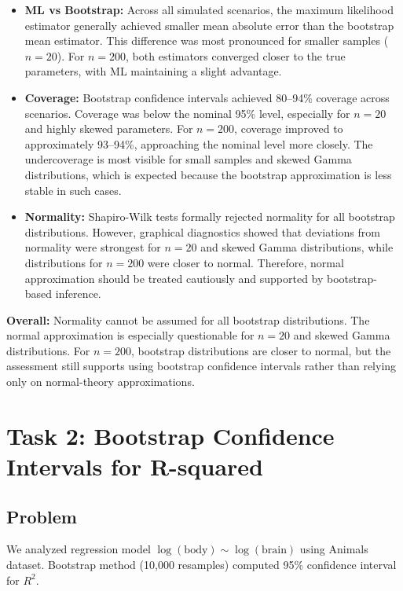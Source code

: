 \documentclass[12pt, a4paper]{article}\usepackage[]{graphicx}\usepackage[]{xcolor}
\begin{document}
\begin{itemize}
\item \textbf{ML vs Bootstrap:} Across all simulated scenarios, the maximum likelihood estimator generally achieved smaller mean absolute error than the bootstrap mean estimator. This difference was most pronounced for smaller samples ($n=20$). For $n=200$, both estimators converged closer to the true parameters, with ML maintaining a slight advantage.

\item \textbf{Coverage:} Bootstrap confidence intervals achieved 80--94\% coverage across scenarios. Coverage was below the nominal 95\% level, especially for $n=20$ and highly skewed parameters. For $n=200$, coverage improved to approximately 93--94\%, approaching the nominal level more closely. The undercoverage is most visible for small samples and skewed Gamma distributions, which is expected because the bootstrap approximation is less stable in such cases.

\item \textbf{Normality:} Shapiro-Wilk tests formally rejected normality for all bootstrap distributions. However, graphical diagnostics showed that deviations from normality were strongest for $n=20$ and skewed Gamma distributions, while distributions for $n=200$ were closer to normal. Therefore, normal approximation should be treated cautiously and supported by bootstrap-based inference.
\end{itemize}

\textbf{Overall:} Normality cannot be assumed for all bootstrap distributions. The normal approximation is especially questionable for $n = 20$ and skewed Gamma distributions. For $n = 200$, bootstrap distributions are closer to normal, but the assessment still supports using bootstrap confidence intervals rather than relying only on normal-theory approximations.

\section{Task 2: Bootstrap Confidence Intervals for R-squared}

\subsection{Problem}

We analyzed regression model $\log(\text{body}) \sim \log(\text{brain})$ using Animals dataset. Bootstrap method (10,000 resamples) computed 95\% confidence interval for $R^2$.
\end{document}
